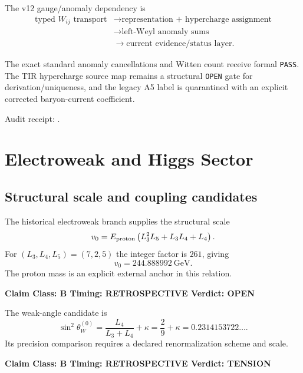 \documentclass[11pt,a4paper,twoside]{book}
\theoremstyle{definition}
\newcommand{\vTwelveStatus}[3]{\par\noindent\textbf{Claim Class: #1 \quad Timing: #2 \quad Verdict: #3}\par}
\begin{document}
The v12 gauge/anomaly dependency is
\[
\boxed{\begin{aligned}
\text{typed }W_{ij}\text{ transport}
&\to \text{representation + hypercharge assignment}\\
&\to \text{left-Weyl anomaly sums}\\
&\to \text{current evidence/status layer}.
\end{aligned}}
\]

The exact standard anomaly cancellations and Witten count receive formal \texttt{PASS}. The TIR hypercharge source map remains a structural \texttt{OPEN} gate for derivation/uniqueness, and the legacy A5 label is quarantined with an explicit corrected baryon-current coefficient.

Audit receipt:
.

\clearpage

\chapter{Electroweak and Higgs Sector}
\label{ch:v12_electroweak_higgs}

\section{Structural scale and coupling candidates}

The historical electroweak branch supplies the structural scale
\begin{equation}
v_0
=E_{\rm proton}\left(L_3^2L_5+L_3L_4+L_4\right).
\label{eq:v12_ew_v0}
\end{equation}
For $(L_3,L_4,L_5)=(7,2,5)$ the integer factor is $261$, giving
\begin{equation}
\boxed{v_0=244.888992\ \mathrm{GeV}}.
\end{equation}
The proton mass is an explicit external anchor in this relation.
\vTwelveStatus{B}{RETROSPECTIVE}{OPEN}

The weak-angle candidate is
\begin{equation}
\boxed{
\sin^2\theta_W^{(0)}
=\frac{L_4}{L_3+L_4}+\kappa
=\frac29+\kappa
=0.2314153722\ldots .
}
\label{eq:v12_sin2w0}
\end{equation}
Its precision comparison requires a declared renormalization scheme and scale.
\vTwelveStatus{B}{RETROSPECTIVE}{TENSION}
\end{document}

